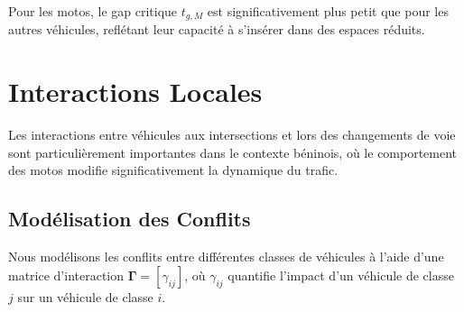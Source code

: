 Pour les motos, le gap critique $t_{g,M}$ est significativement plus petit que pour les autres véhicules, reflétant leur capacité à s'insérer dans des espaces réduits.

\section{Interactions Locales}
\label{sec:interactions_locales}

Les interactions entre véhicules aux intersections et lors des changements de voie sont particulièrement importantes dans le contexte béninois, où le comportement des motos modifie significativement la dynamique du trafic.

\subsection{Modélisation des Conflits}
\label{subsec:conflits}

Nous modélisons les conflits entre différentes classes de véhicules à l'aide d'une matrice d'interaction $\boldsymbol{\Gamma} = [\gamma_{ij}]$, où $\gamma_{ij}$ quantifie l'impact d'un véhicule de classe $j$ sur un véhicule de classe $i$.
